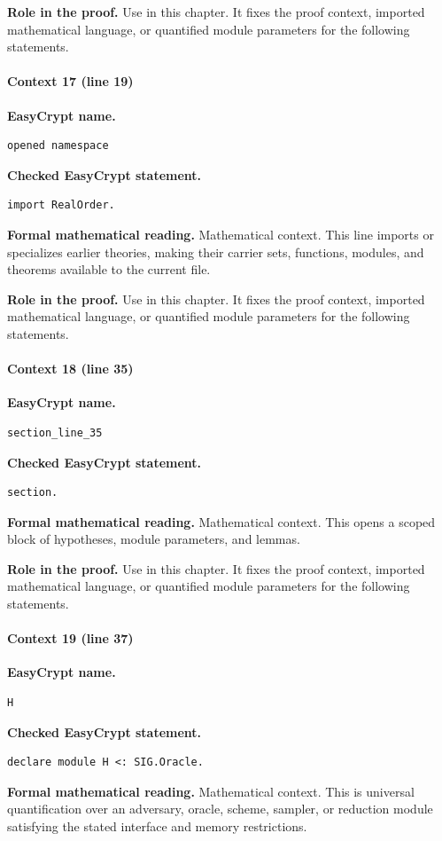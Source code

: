 \noindent\textbf{Role in the proof.}
Use in this chapter. It fixes the proof context, imported mathematical language, or quantified module parameters for the following statements.

\paragraph{Context 17 (line 19)}
\noindent\textbf{EasyCrypt name.}
\begin{lstlisting}[language=EasyCrypt,basicstyle=\ttfamily\scriptsize]
opened namespace
\end{lstlisting}
\noindent\textbf{Checked EasyCrypt statement.}
\begin{lstlisting}[language=EasyCrypt,basicstyle=\ttfamily\scriptsize]
import RealOrder.
\end{lstlisting}
\noindent\textbf{Formal mathematical reading.}
Mathematical context. This line imports or specializes earlier theories, making their carrier sets, functions, modules, and theorems available to the current file.

\noindent\textbf{Role in the proof.}
Use in this chapter. It fixes the proof context, imported mathematical language, or quantified module parameters for the following statements.

\paragraph{Context 18 (line 35)}
\noindent\textbf{EasyCrypt name.}
\begin{lstlisting}[language=EasyCrypt,basicstyle=\ttfamily\scriptsize]
section_line_35
\end{lstlisting}
\noindent\textbf{Checked EasyCrypt statement.}
\begin{lstlisting}[language=EasyCrypt,basicstyle=\ttfamily\scriptsize]
section.
\end{lstlisting}
\noindent\textbf{Formal mathematical reading.}
Mathematical context. This opens a scoped block of hypotheses, module parameters, and lemmas.

\noindent\textbf{Role in the proof.}
Use in this chapter. It fixes the proof context, imported mathematical language, or quantified module parameters for the following statements.

\paragraph{Context 19 (line 37)}
\noindent\textbf{EasyCrypt name.}
\begin{lstlisting}[language=EasyCrypt,basicstyle=\ttfamily\scriptsize]
H
\end{lstlisting}
\noindent\textbf{Checked EasyCrypt statement.}
\begin{lstlisting}[language=EasyCrypt,basicstyle=\ttfamily\scriptsize]
declare module H <: SIG.Oracle.
\end{lstlisting}
\noindent\textbf{Formal mathematical reading.}
Mathematical context. This is universal quantification over an adversary, oracle, scheme, sampler, or reduction module satisfying the stated interface and memory restrictions.

